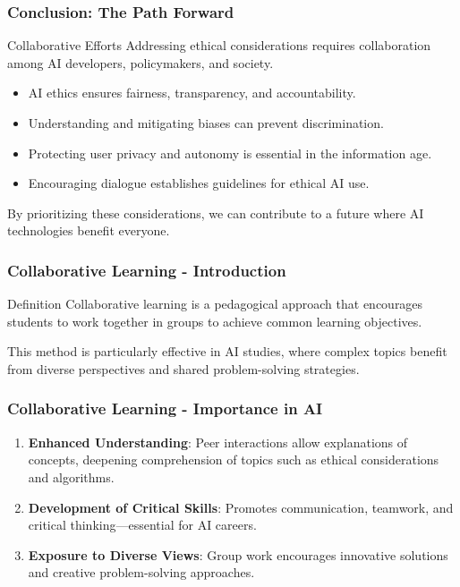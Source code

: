 \documentclass[aspectratio=169]{beamer}
\begin{document}
\begin{frame}[fragile]
    \frametitle{Conclusion: The Path Forward}
    \begin{block}{Collaborative Efforts}
        Addressing ethical considerations requires collaboration among AI developers, policymakers, and society. 
    \end{block}
    
    \begin{itemize}
        \item AI ethics ensures fairness, transparency, and accountability.
        \item Understanding and mitigating biases can prevent discrimination.
        \item Protecting user privacy and autonomy is essential in the information age.
        \item Encouraging dialogue establishes guidelines for ethical AI use.
    \end{itemize}

    By prioritizing these considerations, we can contribute to a future where AI technologies benefit everyone.
\end{frame}

\begin{frame}[fragile]
    \frametitle{Collaborative Learning - Introduction}
    \begin{block}{Definition}
        Collaborative learning is a pedagogical approach that encourages students to work together in groups to achieve common learning objectives. 
    \end{block}
    This method is particularly effective in AI studies, where complex topics benefit from diverse perspectives and shared problem-solving strategies.
\end{frame}

\begin{frame}[fragile]
    \frametitle{Collaborative Learning - Importance in AI}
    \begin{enumerate}
        \item \textbf{Enhanced Understanding}: Peer interactions allow explanations of concepts, deepening comprehension of topics such as ethical considerations and algorithms.
        
        \item \textbf{Development of Critical Skills}: Promotes communication, teamwork, and critical thinking—essential for AI careers.
        
        \item \textbf{Exposure to Diverse Views}: Group work encourages innovative solutions and creative problem-solving approaches.
    \end{enumerate}
\end{frame}
\end{document}
